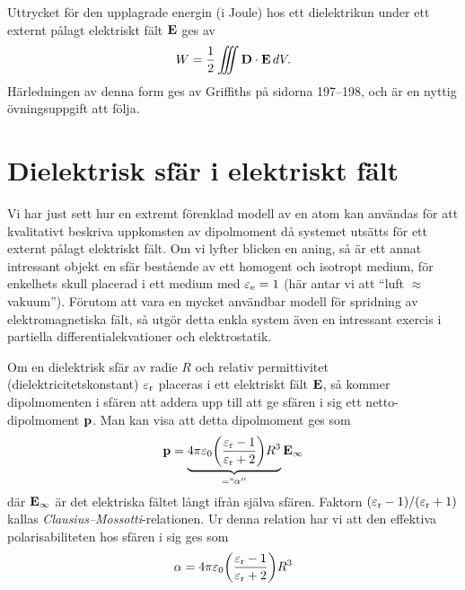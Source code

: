 {Uttrycket f{\"o}r den upplagrade energin (i Joule) hos ett dielektrikun under
ett externt p{\aa}lagt elektriskt f{\"a}lt ${\bf E}$ ges av
$$
  W = {{1}\over{2}}\iiint{\bf D}\cdot{\bf E}\,dV.
$$
H{\"a}rledningen av denna form ges av Griffiths p{\aa} sidorna 197--198, och
{\"a}r en nyttig {\"o}vningsuppgift att f{\"o}lja.

\section{Dielektrisk sf{\"a}r i elektriskt f{\"a}lt}
Vi har just sett hur en extremt f{\"o}renklad modell av en atom kan anv{\"a}ndas
f{\"o}r att kvalitativt beskriva uppkomsten av dipolmoment d{\aa} systemet
uts{\"a}tts f{\"o}r ett externt p{\aa}lagt elektriskt f{\"a}lt. Om vi lyfter
blicken en aning, s{\aa} {\"a}r ett annat intressant objekt en sf{\"a}r
best{\aa}ende av ett homogent och isotropt medium, f{\"o}r enkelhets skull
placerad i ett medium med $\varepsilon_{\rm e}=1$ (h{\"a}r antar vi att ``luft
$\approx$ vakuum''). F{\"o}rutom att vara en mycket anv{\"a}ndbar modell
f{\"o}r spridning av elektromagnetiska f{\"a}lt, s{\aa} utg{\"o}r detta enkla
system {\"a}ven en intressant exercis i partiella differentialekvationer och
elektrostatik.

Om en dielektrisk sf{\"a}r av radie $R$ och relativ permittivitet
(dielektricitetskonstant) $\varepsilon_{\rm r}$ placeras i ett elektriskt
f{\"a}lt ${\bf E}$, s{\aa} kommer dipolmomenten i sf{\"a}ren att addera upp
till att ge sf{\"a}ren i sig ett netto-dipolmoment ${\bf p}$. Man kan visa att
detta dipolmoment ges som
$$
  {\bf p}=\underbrace{4\pi\varepsilon_0
    \bigg({{\varepsilon_{\rm r}-1}\over{\varepsilon_{\rm r}+2}}\bigg)
      R^3}_{=``\alpha''}{\bf E}_{\infty}
$$
d{\"a}r ${\bf E}_{\infty}$ {\"a}r det elektriska f{\"a}ltet l{\aa}ngt ifr{\aa}n
sj{\"a}lva sf{\"a}ren. Faktorn $(\varepsilon_{\rm r}-1)/(\varepsilon_{\rm r}+1)$
kallas {\it Clausius--Mossotti}-relationen.
Ur denna relation har vi att den effektiva polarisabiliteten
 hos sf{\"a}ren
i sig ges som
$$
  \alpha=4\pi\varepsilon_0
    \bigg({{\varepsilon_{\rm r}-1}\over{\varepsilon_{\rm r}+2}}\bigg) R^3
$$
\vfill\eject

}
